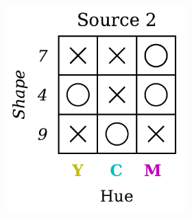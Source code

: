 \begin{definition}
\begin{figure}[H]
\begin{subfigure}[b]{0.45\textwidth}
\begin{subfigure}[b]{0.48\textwidth}
                \includegraphics[width=\textwidth]{img/datasets/2-CGO_fact=hue_env=1.pdf}
            \end{subfigure}
        \end{subfigure}
        \hfill
        \begin{subfigure}[b]{0.45\textwidth}
            \centering
            \begin{subfigure}[b]{0.48\textwidth}
                \centering

\end{subfigure}
\end{subfigure}
\end{figure}
\end{definition}
